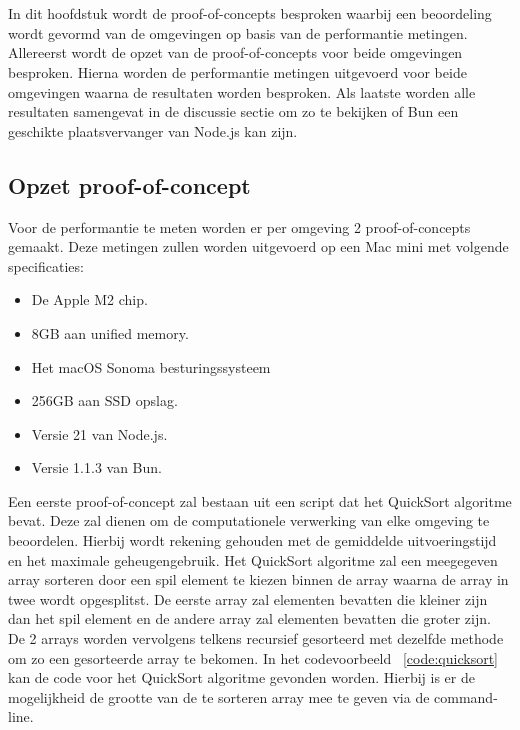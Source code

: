\chapter{}%
\label{ch:proof-of-concept}

In dit hoofdstuk wordt de proof-of-concepts besproken 
waarbij een beoordeling wordt gevormd van de omgevingen op basis van de performantie metingen.
Allereerst wordt de opzet van de proof-of-concepts voor beide omgevingen besproken.
Hierna worden de performantie metingen uitgevoerd voor beide omgevingen waarna de resultaten worden besproken.
Als laatste worden alle resultaten samengevat in de discussie sectie om zo te bekijken of Bun een geschikte plaatsvervanger
van Node.js kan zijn.

\section{Opzet proof-of-concept}
Voor de performantie te meten worden er per omgeving 2 proof-of-concepts gemaakt. 
Deze metingen zullen worden uitgevoerd op een Mac mini met volgende specificaties:
\begin{itemize}
  \item De Apple M2 chip.
  \item 8GB aan unified memory.
  \item Het macOS Sonoma besturingssysteem
  \item 256GB aan SSD opslag.
  \item Versie 21 van Node.js.
  \item Versie 1.1.3 van Bun.
\end{itemize}
Een eerste proof-of-concept zal bestaan uit een script dat het QuickSort algoritme bevat. 
Deze zal dienen om de computationele verwerking van elke omgeving te beoordelen. 
Hierbij wordt rekening gehouden met de gemiddelde uitvoeringstijd en het maximale geheugengebruik.
Het QuickSort algoritme zal een meegegeven array sorteren door een spil element te kiezen binnen de array
waarna de array in twee wordt opgesplitst. De eerste array zal elementen bevatten die kleiner zijn dan het spil element 
en de andere array zal elementen bevatten die groter zijn. 
De 2 arrays worden vervolgens telkens recursief gesorteerd met dezelfde methode om zo een gesorteerde array te bekomen.
In het codevoorbeeld ~\ref{code:quicksort} kan de code voor het QuickSort algoritme gevonden worden.
Hierbij is er de mogelijkheid de grootte van de te sorteren array mee te geven via de command-line.

